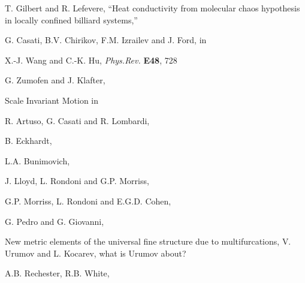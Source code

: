  T. Gilbert  and R. Lefevere,
    ``Heat conductivity from molecular chaos hypothesis
             in locally confined billiard systems,''

 G. Casati, B.V. Chirikov, F.M. Izrailev and J. Ford, in

 X.-J. Wang and C.-K. Hu, {\em Phys.Rev.} {\bf E48}, 728

 G. Zumofen and J. Klafter, {\sf Scale Invariant Motion in

 R. Artuso, G. Casati and R. Lombardi,

 B. Eckhardt,

 L.A. Bunimovich,

  J. Lloyd, L. Rondoni and G.P. Morriss,

  G.P. Morriss, L. Rondoni and E.G.D. Cohen,


 G. Pedro and G. Giovanni, %



 {New metric elements of the universal fine structure due to multifurcations},
 {V. Urumov and L. Kocarev},
{what is Urumov about?}

 A.B. Rechester, R.B. White,

}
